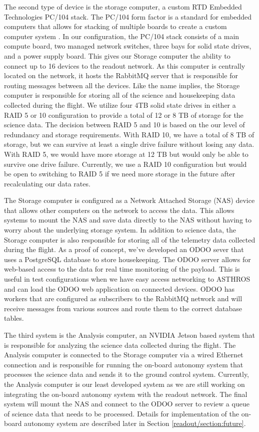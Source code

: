 The second type of device is the storage computer, a custom RTD Embedded Technologies PC/104 stack.
The PC/104 form factor is a standard for embedded computers that allows for stacking of multiple boards to create a custom computer system \parencite{5731130}.
In our configuration, the PC/104 stack consists of a main compute board, two managed network switches, three bays for solid state drives, and a power supply board.
This gives our Storage computer the ability to connect up to 16 devices to the readout network. 
As this computer is centrally located on the network, it hosts the RabbitMQ server that is responsible for routing messages between all the devices. 
Like the name implies, the Storage computer is responsible for storing all of the science and housekeeping data collected during the flight.
We utilize four 4TB solid state drives in either a RAID 5 or 10 configuration to provide a total of 12 or 8 TB of storage for the science data.
The decision between RAID 5 and 10 is based on the our level of redundancy and storage requirements. 
With RAID 10, we have a total of 8 TB of storage, but we can survive at least a single drive failure without losing any data.
With RAID 5, we would have more storage at 12 TB but would only be able to survive one drive failure.
Currently, we use a RAID 10 configuration but would be open to switching to RAID 5 if we need more storage in the future after recalculating our data rates. 

The Storage computer is configured as a Network Attached Storage (NAS) device that allows other computers on the network to access the data.
This allows systems to mount the NAS and save data directly to the NAS without having to worry about the underlying storage system.
In addition to science data, the Storage computer is also responsible for storing all of the telemetry data collected during the flight.
As a proof of concept, we've developed an ODOO sever that uses a PostgreSQL database to store housekeeping. 
The ODOO server allows for web-based access to the data for real time monitoring of the payload.
This is useful in test configurations when we have easy access networking to ASTHROS and can load the ODOO web application on connected devices.
ODOO has workers that are configured as subscribers to the RabbitMQ network and will receive messages from various sources and route them to the correct database tables.

The third system is the Analysis computer, an NVIDIA Jetson based system that is responsible for analyzing the science data collected during the flight.
The Analysis computer is connected to the Storage computer via a wired Ethernet connection and is responsible for running the on-board autonomy system that processes the science data and sends it to the ground control system.
Currently, the Analysis computer is our least developed system as we are still working on integrating the on-board autonomy system with the readout network.
The final system will mount the NAS and connect to the ODOO server to review a queue of science data that needs to be processed.
Details for implementation of the on-board autonomy system are described later in Section \ref{readout/section:future}.

